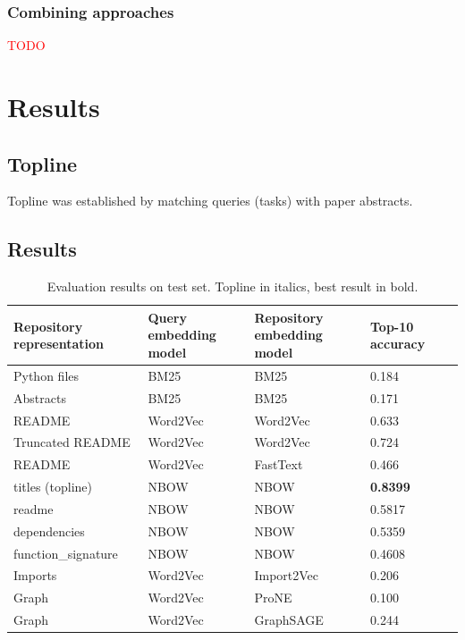 \documentclass[longabstract,mgr,english]{iithesis}
\newcommand{\TODO}{\textcolor{red}{\huge{TODO}}}
\begin{document}
\subsection{Combining approaches}

\TODO

\chapter{Results}

\section{Topline}


Topline was established by matching queries (tasks) with paper abstracts.

\section{Results}

\begin{table}[htbp]
  \centering
  \caption{Evaluation results on test set. Topline in italics, best result in bold.}
 \begin{tabular}{|p{4cm}|p{3cm}|p{2cm}|p{2cm}|p{1cm}|}
 \hline
  Repository \newline representation & Query \newline embedding model &  Repository embedding model & Top-10 \newline accuracy \\
 \hline 
   Python files & BM25 & BM25 & 0.184 \\ 
  Abstracts & BM25 & BM25 & 0.171 \\ 
  README                    & Word2Vec              & Word2Vec                   &            0.633 \\
  Truncated README                    & Word2Vec              & Word2Vec                   &            0.724 \\
  README                    & Word2Vec              & FastText                   &           0.466 \\
                                           titles (topline) &        NBOW &             NBOW &           \textbf{0.8399} \\
                   readme &        NBOW &             NBOW &           0.5817 \\
             dependencies &        NBOW &             NBOW &           0.5359 \\
       function\_signature &        NBOW &             NBOW &           0.4608 \\
  Imports                   & Word2Vec              & Import2Vec                 &        0.206 \\
  Graph                     & Word2Vec              & ProNE                      &            0.100 \\
  Graph                     & Word2Vec              & GraphSAGE                            & 0.244         \\
 \hline
 \end{tabular}
\end{table}
\end{document}
